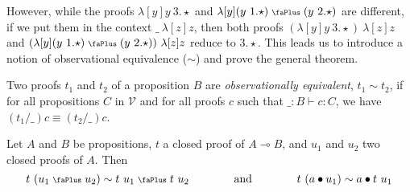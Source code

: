 \documentclass[screen, sigconf,authorversion,nonacm]{acmart}
\theoremstyle{acmdefinition}
\numberwithin{equation}{section}
\newcommand\abstr[1]{[#1]}
\newcommand\plus{\mathrel{\text{\normalfont\scalebox{0.7}{\faPlus}}}}
\begin{document}
However, while the proofs $\lambda \abstr{y} y~3.\star$ and $\lambda
\abstr{y} {(y~1.\star)} \plus {(y~2.\star)}$ are different, if we put
them in the context $\_~\lambda \abstr{z} z$, then both proofs
$(\lambda \abstr{y} y~3.\star)~\lambda \abstr{z} z$ and $(\lambda
\abstr{y} {(y~1.\star)} \plus {(y~2.\star)})~\lambda \abstr{z} z$
reduce to $3.\star$.  This leads us to introduce a notion of
observational equivalence ($\sim$) and prove the general theorem.

\begin{definition}\label{def:obseq}
Two proofs $t_1$ and $t_2$ of a proposition $B$ are {\it
observationally equivalent}, $t_1 \sim t_2$, if for all propositions
$C$ in $\mathcal{V}$ and for all proofs $c$ such that $\_:B \vdash
c:C$, we have $(t_1/\_)c \equiv (t_2/\_)c$.
\end{definition}

\begin{theorem}
\label{corollary2}
Let $A$ and $B$ be propositions, $t$ a closed proof of $A \multimap
B$, and $u_1$ and $u_2$ two closed proofs of $A$.  Then
$$t~(u_1 \plus u_2) \sim t~u_1 \plus t~u_2
\qquad\qquad\textrm{and}\qquad\qquad
t~(a\bullet u_1) \sim a\bullet t~u_1$$
\end{theorem}
\end{document}
